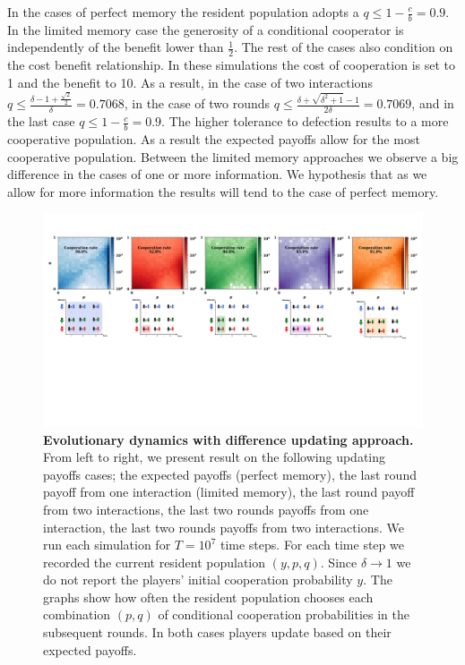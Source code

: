 \documentclass[11pt]{article}
\theoremstyle{plainCl1}
\theoremstyle{plainCl2}
\begin{document}
In the cases of perfect memory the resident population adopts a \(q \leq 1 -
\frac{c}{b}=0.9\). In the limited memory case the generosity of a conditional
cooperator is independently of the benefit lower than \(\frac{1}{2}\). The rest
of the cases also condition on the cost benefit relationship. In these
simulations the cost of cooperation is set to 1 and the benefit to 10. As a
result, in the case of two interactions \(q \leq \frac{\delta - 1 +
\frac{\sqrt{2}}{2}}{\delta}=0.7068\), in the case of two rounds \(q \leq
\frac{\delta + \sqrt{\delta^{2} + 1} - 1}{2 \delta}=0.7069\), and in the last
case \(q \leq 1 - \frac{c}{b}=0.9\). The higher tolerance to defection results
to a more cooperative population. As a result the expected payoffs allow for the
most cooperative population. Between the limited memory approaches we observe a
big difference in the cases of one or more information. We hypothesis that as we
allow for more information the results will tend to the case of perfect memory.

\begin{figure}[!htbp]
    \centering 
    \includegraphics[width=\textwidth]{static/more_memory_heatmaps_donation_game_with_illustrations.pdf}
    \caption{\textbf{Evolutionary dynamics with difference updating approach.}
    From left to right, we present result on the following updating payoffs
    cases; the expected payoffs (perfect memory), the last round payoff
    from one interaction (limited memory), the last round payoff from two
    interactions, the last two rounds payoffs from one interaction, the
    last two rounds payoffs from two interactions. We run each simulation for \(T
    = 10^7\) time steps. For each time step we recorded the current resident
    population \((y, p, q)\). Since \(\delta \rightarrow 1\) we do not report the
    players' initial cooperation probability \(y\). The graphs show how often the
    resident population chooses each combination \((p, q)\) of conditional
    cooperation probabilities in the subsequent rounds. In both cases players
    update based on their expected payoffs.}\label{fig:expected_payoffs_results}
\end{figure}
\end{document}
